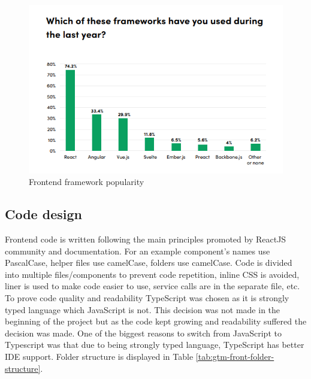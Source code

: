 \begin{figure}[h]
    \includegraphics[width=\textwidth]{figures/frontend_framework_popularity.png}
    \caption{Frontend framework popularity \cite{state-of-frontend-report}}
    \label{fig:frontend-framework-popularity}
\end{figure}

\subsection{Code design}\label{subsec:code-design}
Frontend code is written following the main principles promoted by ReactJS community and documentation.
For an example component's names use PascalCase, helper files use camelCase, folders use camelCase.
Code is divided into multiple files/components to prevent code repetition, inline CSS is avoided, liner is used to make code easier to use, service calls are in the separate file, etc.
To prove code quality and readability TypeScript was chosen as it is strongly typed language which JavaScript is not.
This decision was not made in the beginning of the project but as the code kept growing and readability suffered the decision was made.
One of the biggest reasons to switch from JavaScript to Typescript was that due to being strongly typed language,
TypeScript has better IDE support.
Folder structure is displayed in Table
\ref{tab:gtm-front-folder-structure}.

